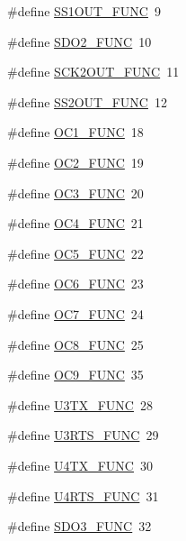 \begin{DoxyCompactItemize}
\item 
\#define \hyperlink{pps-macro_8h_ad2edc0e79299335ba4d10f18e6b4bae8}{S\+S1\+O\+U\+T\+\_\+\+F\+U\+N\+C}~9
\item 
\#define \hyperlink{pps-macro_8h_a3826500c905f7ace212b6684dcef38d2}{S\+D\+O2\+\_\+\+F\+U\+N\+C}~10
\item 
\#define \hyperlink{pps-macro_8h_a2d4ce671fffe42c1fa9bb708f6846673}{S\+C\+K2\+O\+U\+T\+\_\+\+F\+U\+N\+C}~11
\item 
\#define \hyperlink{pps-macro_8h_a91f2d7ca98c64d374650418de37a2c80}{S\+S2\+O\+U\+T\+\_\+\+F\+U\+N\+C}~12
\item 
\#define \hyperlink{pps-macro_8h_a28d0d3c3a473e5d87ad435c48589d1a5}{O\+C1\+\_\+\+F\+U\+N\+C}~18
\item 
\#define \hyperlink{pps-macro_8h_a4fc3d8333be5f0ece5cce862d07157a6}{O\+C2\+\_\+\+F\+U\+N\+C}~19
\item 
\#define \hyperlink{pps-macro_8h_a03e82f82a541a4e050612833bcca748c}{O\+C3\+\_\+\+F\+U\+N\+C}~20
\item 
\#define \hyperlink{pps-macro_8h_a4275d5e2522c9a1219a68d2c685c67c0}{O\+C4\+\_\+\+F\+U\+N\+C}~21
\item 
\#define \hyperlink{pps-macro_8h_a366467101d1b3470f0671fa57e165854}{O\+C5\+\_\+\+F\+U\+N\+C}~22
\item 
\#define \hyperlink{pps-macro_8h_a6f2533707e9daa8b689fedcfd1b779bb}{O\+C6\+\_\+\+F\+U\+N\+C}~23
\item 
\#define \hyperlink{pps-macro_8h_a9a8255318c057701fa8981f934c6e445}{O\+C7\+\_\+\+F\+U\+N\+C}~24
\item 
\#define \hyperlink{pps-macro_8h_ac70b9e4220b87e2142bfb0d717781df3}{O\+C8\+\_\+\+F\+U\+N\+C}~25
\item 
\#define \hyperlink{pps-macro_8h_a8fdbac7525bb3267cc225d0a88a8cf7c}{O\+C9\+\_\+\+F\+U\+N\+C}~35
\item 
\#define \hyperlink{pps-macro_8h_ab8bc397aca7e4b629eb154259063de56}{U3\+T\+X\+\_\+\+F\+U\+N\+C}~28
\item 
\#define \hyperlink{pps-macro_8h_a5a90228bafd5a2cf50c101fef1a17424}{U3\+R\+T\+S\+\_\+\+F\+U\+N\+C}~29
\item 
\#define \hyperlink{pps-macro_8h_a9f2a522bfb3bc38e0ac2c79912dc7a09}{U4\+T\+X\+\_\+\+F\+U\+N\+C}~30
\item 
\#define \hyperlink{pps-macro_8h_ae36e3a7ed394d3b751710c56c8e36b24}{U4\+R\+T\+S\+\_\+\+F\+U\+N\+C}~31
\item 
\#define \hyperlink{pps-macro_8h_a5ff886f3a58dc672830f10744775c2b8}{S\+D\+O3\+\_\+\+F\+U\+N\+C}~32

\end{DoxyCompactItemize}
